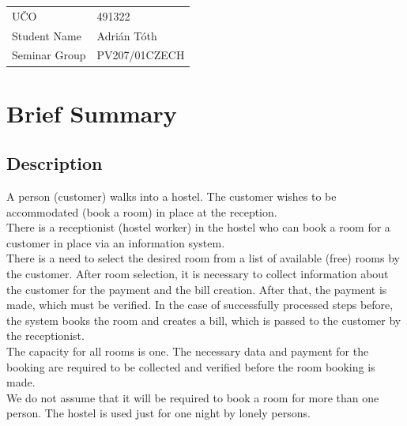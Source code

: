 \documentclass[11pt,a4paper]{article}
\begin{document}
\begin{center}
    \begin{tabular}{l|l}
        UČO           & 491322        \\
        Student Name  & Adrián Tóth   \\
        Seminar Group & PV207/01CZECH \\
    \end{tabular}
\end{center}

\section{Brief Summary}

    \subsection{Description}

        \begin{adjustwidth}{2.5cm}{2.5cm}

            \noindent A person (customer) walks into a hostel. The customer wishes to be accommodated (book a room) in place at the reception.\\

            \noindent There is a receptionist (hostel worker) in the hostel who can book a room for a customer in place via an information system.\\

            \noindent There is a need to select the desired room from a list of available (free) rooms by the customer. After room selection, it is necessary to collect information about the customer for the payment and the bill creation. After that, the payment is made, which must be verified. In the case of successfully processed steps before, the system books the room and creates a bill, which is passed to the customer by the receptionist.\\

            \noindent The capacity for all rooms is one. The necessary data and payment for the booking are required to be collected and verified before the room booking is made.\\

            \noindent We do not assume that it will be required to book a room for more than one person. The hostel is used just for one night by lonely persons.
        \end{adjustwidth}

\newpage


\end{document}
